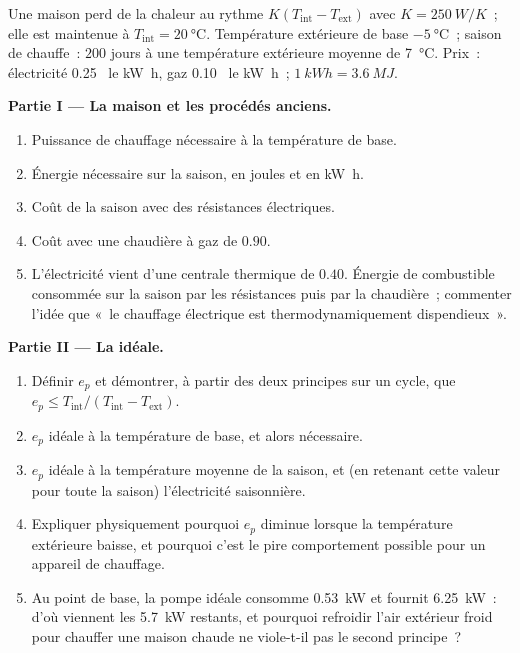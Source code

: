 \begin{problem}
\label{pb:b1:heat-engines:1}
Une maison perd de la chaleur au rythme $K(T_{\mathrm{int}} - T_{\mathrm{ext}})$ avec
$K = \qty{250}{W/K}$~; elle est maintenue à $T_{\mathrm{int}} = \qty{20}{\degreeCelsius}$.
Température extérieure de base $\qty{-5}{\degreeCelsius}$~; saison de chauffe~:
$200$ jours à une température extérieure moyenne de \qty{7}{\degreeCelsius}.
Prix~: électricité 0.25~\texteuro{} le \unit{kW h}, gaz 0.10~\texteuro{} le
\unit{kW h}~; $\qty{1}{kW h} = \qty{3.6}{MJ}$.

\medskip
\noindent\textbf{Partie I --- La maison et les procédés anciens.}
\begin{enumerate}
  \item Puissance de chauffage nécessaire à la température de base.
  \item Énergie nécessaire sur la saison, en joules et en \unit{kW h}.
  \item Coût de la saison avec des résistances électriques.
  \item Coût avec une chaudière à gaz de  $0.90$.
  \item L'électricité vient d'une centrale thermique de 
        $0.40$. Énergie de combustible consommée sur la saison par les
        résistances puis par la chaudière~; commenter l'idée que «~le
        chauffage électrique est thermodynamiquement dispendieux~».
\end{enumerate}

\medskip
\noindent\textbf{Partie II --- La  idéale.}
\begin{enumerate}[resume]
  \item Définir $e_p$ et démontrer, à partir des deux principes sur un
        cycle, que $e_p \leq T_{\mathrm{int}}/(T_{\mathrm{int}} - T_{\mathrm{ext}})$.
  \item $e_p$ idéale à la température de base, et 
        alors nécessaire.
  \item $e_p$ idéale à la température moyenne de la saison, et (en retenant
        cette valeur pour toute la saison) l'électricité saisonnière.
  \item Expliquer physiquement pourquoi $e_p$ diminue lorsque la température
        extérieure baisse, et pourquoi c'est le pire comportement possible
        pour un appareil de chauffage.
  \item Au point de base, la pompe idéale consomme \qty{0.53}{kW} et
        fournit \qty{6.25}{kW}~: d'où viennent les \qty{5.7}{kW} restants,
        et pourquoi refroidir l'air extérieur froid pour chauffer une
        maison chaude ne viole-t-il pas le second principe~?
\end{enumerate}


\end{problem}
